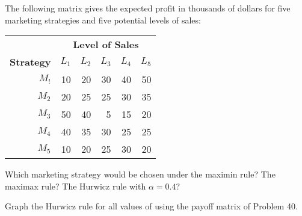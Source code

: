 \begin{exercises}
    \begin{exercise}
    \label{sea-7-41}
        The following matrix gives the expected profit in thousands of dollars for five marketing strategies and five potential levels of sales:
        \begin{table}[h]
        \centering
        \begin{tabular}{r r r r r r}
        \toprule
         & \multicolumn{5}{c}{\textbf{Level of Sales}} \\
        \textbf{Strategy} & \textbf{$L_1$} & \textbf{$L_2$} & \textbf{$L_3$} & \textbf{$L_4$} & \textbf{$L_5$} \\
        \midrule
        $M_!$ & 10 & 20 & 30 & 40 & 50 \\
        $M_2$ & 20 & 25 & 25 & 30 & 35 \\
        $M_3$ & 50 & 40 &  5 & 15 & 20 \\
        $M_4$ & 40 & 35 & 30 & 25 & 25 \\
        $M_5$ & 10 & 20 & 25 & 30 & 20 \\
        \bottomrule
        \end{tabular}
        \label{tab:sea-7-41} %
        \end{table}
        Which marketing strategy would be chosen under the maximin rule? The maximax rule? The Hurwicz rule with $\alpha=0.4$?
    \end{exercise}
    \begin{solution}
    \end{solution}
    
    \begin{exercise}
    \label{sea-7-42}
        Graph the Hurwicz rule for all values of   using the payoff matrix of Problem 40.
    \end{exercise}
    \begin{solution}
    \end{solution}
    

\end{exercises}
